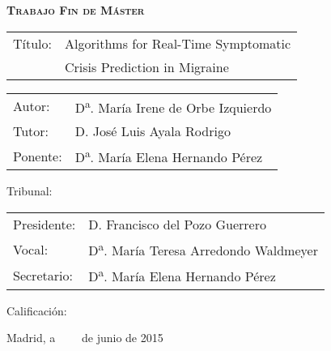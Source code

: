 


\begin{center}
\large
\textsc{\textbf{Trabajo Fin de Máster}}\\
\end{center}

\vspace*{3cm}

\begin{tabular}{p{3cm}l}
Título:&Algorithms for Real-Time Symptomatic\\
&Crisis Prediction in Migraine\\
\end{tabular}


\vspace*{0.5cm}

\begin{tabular}{p{3cm}l}
Autor:&D\textsuperscript{a}. María Irene de Orbe Izquierdo\\
Tutor:&D. José Luis Ayala Rodrigo\\
Ponente:&D\textsuperscript{a}. María Elena Hernando Pérez\\
\end{tabular}

\vspace*{2.5cm}
Tribunal:

\vspace*{0.5cm}
\begin{tabular}{p{3cm}l}
	Presidente:&D. Francisco del Pozo Guerrero\\
	Vocal:&D\textsuperscript{a}. María Teresa Arredondo Waldmeyer\\
	Secretario:&D\textsuperscript{a}. María Elena Hernando Pérez\\
\end{tabular}


\vspace*{1.5cm}


Calificación:

\vspace*{2cm}

\begin{flushright}
Madrid, a \ \ \ \  de junio de 2015
\end{flushright}

\thispagestyle{empty}
